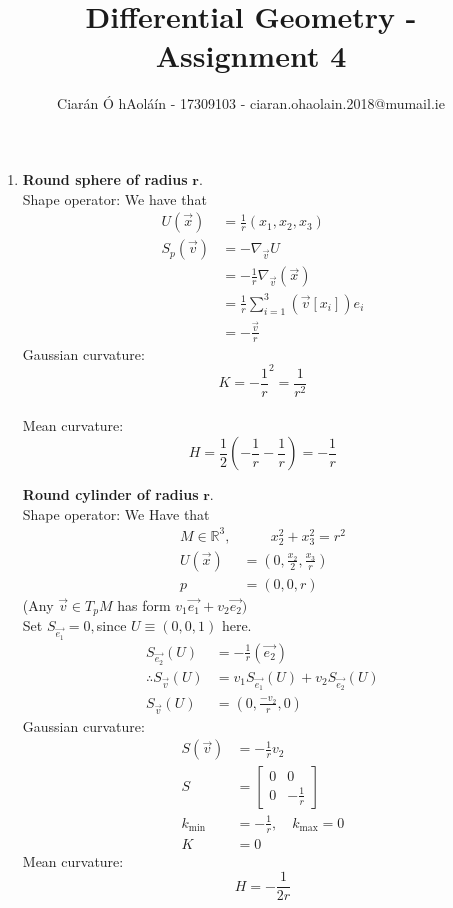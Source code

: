 \documentclass{article}
\title{Differential Geometry - Assignment 4}
\author{Ciarán Ó hAoláín - 17309103 - ciaran.ohaolain.2018@mumail.ie}
\newcommand{\R}{\mathbb{R}}
\theoremstyle{definition}
\theoremstyle{remark}
\theoremstyle{example}
\begin{document}
	\maketitle
	
	\begin{enumerate}
		\item \textbf{Round sphere of radius} $\mathbf{r}$.\\
		Shape operator: We have that \begin{align*}
			U(\vec{x})&=\frac{1}{r}(x_1,x_2,x_3)\\
			 S_p(\vec{v})&=-\nabla_{\vec{v}}U\\
			 &=-\frac{1}{r}\nabla_{\vec{v}}(\vec{x})\\
			 &= \frac{1}{r}\sum_{i=1}^{3}(\vec{v}[x_i])e_i\\
			 &=-\frac{\vec{v}}{r}
		\end{align*}
		Gaussian curvature:\\
		\[K=-\frac1r^2=\frac1{r^2}\]\\
		Mean curvature:\\
		\[H=\frac12(-\frac1r-\frac1r)=-\frac{1}{r}\]
		
		\pagebreak
		
		\textbf{Round cylinder of radius} $\mathbf{r}$.\\
		Shape operator: We Have that \begin{align*}
			M \in \R^3, & \qquad x_2^2+x_3^2=r^2\\
			U(\vec{x})&=\left(0,\frac{x_2}{2},\frac{x_3}{r}\right)\\
			p&=(0,0,r)
		\end{align*}
		(Any $\vec{v}\in T_pM$ has form $v_1\vec{e_1}+v_2\vec{e_2})$\\
		Set $S_{\vec{e_1}}=0,$since $U \equiv (0,0,1)$ here.\\
		\begin{align*}
			S_{\vec{e_2}}(U)&=-\frac{1}{r}(\vec{e_2})\\
			\therefore S_{\vec{v}}(U)&=v_1 S_{\vec{e_1}}(U)+v_2 S_{\vec{e_2}}(U)\\
			S_{\vec{v}}(U)&=(0,\frac{-v_2}{r},0)
		\end{align*}
		Gaussian curvature:\\
		\begin{align*}
			S(\vec{v})&=-\frac{1}{r}v_2\\
			S&=\begin{bmatrix}
			0 & 0 \\
			0 & -\frac{1}{r}
			\end{bmatrix}\\
			k_{\min} &= -\frac{1}{r}, \quad k_{\max} = 0\\
			K&=0
		\end{align*}
		Mean curvature:\\
		\[ H=-\frac1{2r} \]
		

\end{enumerate}
\end{document}
